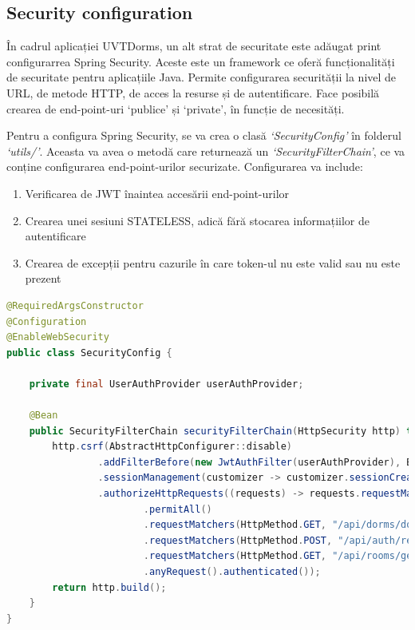 \documentclass[12pt,a4paper]{report}
\theoremstyle{definition}
\theoremstyle{remark}
\begin{document}
\subsection{Security configuration}

\par În cadrul aplicației UVTDorms, un alt strat de securitate este adăugat print configurarrea Spring Security\cite{spilca2020spring}. Aceste este un framework ce oferă funcționalități de securitate pentru aplicațiile Java. Permite configurarea securității la nivel de URL, de metode HTTP, de acces la resurse și de autentificare. Face posibilă crearea de end-point-uri `publice' și `private', în funcție de necesități.

\par Pentru a configura Spring Security, se va crea o clasă \textit{`SecurityConfig'} în folderul \textit{`utils/'}. Aceasta va avea o metodă care returnează un \textit{`SecurityFilterChain'}, ce va conține configurarea end-point-urilor securizate. Configurarea va include:

\begin{enumerate}
    \item Verificarea de JWT înaintea accesării end-point-urilor
    \item Crearea unei sesiuni STATELESS, adică fără stocarea informațiilor de autentificare
    \item Crearea de excepții pentru cazurile în care token-ul nu este valid sau nu este prezent
\end{enumerate}

\begin{lstlisting}[language=Java, caption={Clasa prin care se realizează configurarea Spring Security}]
@RequiredArgsConstructor
@Configuration
@EnableWebSecurity
public class SecurityConfig {

    private final UserAuthProvider userAuthProvider;

    @Bean
    public SecurityFilterChain securityFilterChain(HttpSecurity http) throws Exception {
        http.csrf(AbstractHttpConfigurer::disable)
                .addFilterBefore(new JwtAuthFilter(userAuthProvider), BasicAuthenticationFilter.class)
                .sessionManagement(customizer -> customizer.sessionCreationPolicy(SessionCreationPolicy.STATELESS))
                .authorizeHttpRequests((requests) -> requests.requestMatchers(HttpMethod.POST, "/api/auth/login")
                        .permitAll()
                        .requestMatchers(HttpMethod.GET, "/api/dorms/dorms-names").permitAll()
                        .requestMatchers(HttpMethod.POST, "/api/auth/register-student").permitAll()
                        .requestMatchers(HttpMethod.GET, "/api/rooms/get-rooms-numbers-from-dorm/**").permitAll()
                        .anyRequest().authenticated());
        return http.build();
    }
}
\end{lstlisting}
\end{document}
